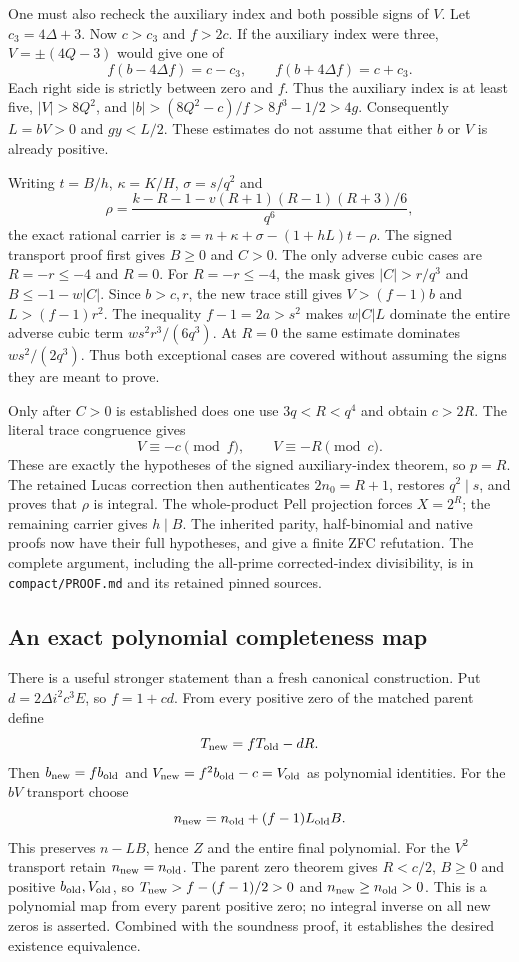 One must also recheck the auxiliary index and both possible signs of $V$.
Let $c_3=4\Delta+3$. Now $c>c_3$ and $f>2c$. If the auxiliary index
were three, $V=\pm(4Q-3)$ would give one of
\[
 f(b-4\Delta f)=c-c_3,\qquad
 f(b+4\Delta f)=c+c_3.
\]
Each right side is strictly between zero and $f$. Thus the auxiliary
index is at least five, $|V|>8Q^2$, and
$|b|>(8Q^2-c)/f>8f^3-1/2>4g$.
Consequently $L=bV>0$ and $gy<L/2$. These estimates do not assume
that either $b$ or $V$ is already positive.

Writing $t=B/h$, $\kappa=K/H$, $\sigma=s/q^2$ and
\[
 \rho=\frac{k-R-1-v(R+1)(R-1)(R+3)/6}{q^6},
\]
the exact rational carrier is
$z=n+\kappa+\sigma-(1+hL)t-\rho$.
The signed transport proof first gives $B\ge0$ and $C>0$.
The only adverse cubic cases are $R=-r\le-4$ and $R=0$.
For $R=-r\le-4$, the mask gives $|C|>r/q^3$ and
$B\le-1-w|C|$. Since $b>c,r$, the new trace still gives
$V>(f-1)b$ and $L>(f-1)r^2$. The inequality
$f-1=2a>s^2$ makes $w|C|L$ dominate the entire adverse cubic term
$ws^2r^3/(6q^3)$. At $R=0$ the same estimate dominates
$ws^2/(2q^3)$. Thus both exceptional cases are covered without
assuming the signs they are meant to prove.

Only after $C>0$ is established does one use $3q<R<q^4$ and obtain
$c>2R$. The literal trace congruence gives
\[
 V\equiv-c\pmod f,\qquad V\equiv-R\pmod c.
\]
These are exactly the hypotheses of the signed auxiliary-index theorem,
so $p=R$. The retained Lucas correction then authenticates
$2n_0=R+1$, restores $q^2\mid s$, and proves that $\rho$ is integral.
The whole-product Pell projection forces $X=2^R$; the remaining carrier
gives $h\mid B$. The inherited parity, half-binomial and native proofs now
have their full hypotheses, and give a finite ZFC refutation. The complete
argument, including the all-prime corrected-index divisibility, is in
\texttt{compact/PROOF.md} and its retained pinned sources.

\subsection{An exact polynomial completeness map}
There is a useful stronger statement than a fresh canonical construction.
Put $d=2\Delta i^2c^3E$, so $f=1+cd$. From every positive zero of the
matched parent define
\[
 T_{\rm new}=fT_{\rm old}-dR.
\]
Then $b_{\rm new}=fb_{\rm old}$ and
$V_{\rm new}=f^2b_{\rm old}-c=V_{\rm old}$ as polynomial identities.
For the $bV$ transport choose
\[
 n_{\rm new}=n_{\rm old}+(f-1)L_{\rm old}B.
\]
This preserves $n-LB$, hence $Z$ and the entire final polynomial.
For the $V^2$ transport retain $n_{\rm new}=n_{\rm old}$.
The parent zero theorem gives $R<c/2$, $B\ge0$ and positive
$b_{\rm old},V_{\rm old}$, so
$T_{\rm new}>f-(f-1)/2>0$ and $n_{\rm new}\ge n_{\rm old}>0$.
This is a polynomial map from every parent positive zero; no integral
inverse on all new zeros is asserted. Combined with the soundness proof,
it establishes the desired existence equivalence.


